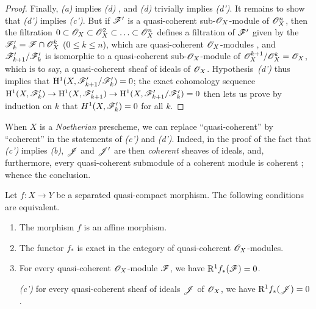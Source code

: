 \begin{proof}
Finally, \emph{(a)} implies \emph{(d)} , and \emph{(d)} trivially implies \emph{(d')}.
It remains to show that \emph{(d')} implies \emph{(c')}.
But if $\mathscr{F}'$ is a quasi-coherent sub-$\mathscr{O}_X$-module of $\mathscr{O}_X^n$, then the filtration $0\subset\mathscr{O}_X\subset\mathscr{O}_X^2\subset\ldots\subset\mathscr{O}_X^n$ defines a filtration of $\mathscr{F}'$ given by the $\mathscr{F}'_k=\mathscr{F}\cap\mathscr{O}_X^k$ ($0\leq k\leq n$), which are quasi-coherent $\mathscr{O}_X$-modules , and $\mathscr{F}'_{k+1}/\mathscr{F}'_k$ is isomorphic to a quasi-coherent sub-$\mathscr{O}_X$-module of $\mathscr{O}_X^{k+1}/\mathscr{O}_X^k=\mathscr{O}_X$, which is to say, a quasi-coherent sheaf of ideals of $\mathscr{O}_X$.
Hypothesis~\emph{(d')} thus implies that $\mathrm{H}^1(X,\mathscr{F}'_{k+1}/\mathscr{F}'_k)=0$;
the exact cohomology sequence $\HH^1(X,\sh{F}'_k)\to\HH^1(X,\sh{F}'_{k+1})\to\HH^1(X,\sh{F}'_{k+1}/\sh{F}'_k)=0$ then lets us prove by induction on $k$ that $H^1(X,\mathscr{F}'_k)=0$ for all $k$.
\end{proof}

\begin{rmk}[5.2.1.1]
\label{2.5.2.1.1}
When $X$ is a \emph{Noetherian} prescheme, we can replace ``quasi-coherent'' by ``coherent'' in the statements of \emph{(c')} and \emph{(d')}.
Indeed, in the proof of the fact that \emph{(c')} implies \emph{(b)}, $\mathscr{J}$ and $\mathscr{J}'$ are then \emph{coherent} sheaves of ideals, and, furthermore, every quasi-coherent submodule of a coherent module is coherent ;
whence the conclusion.
\end{rmk}

\begin{cor}[5.2.2]
\label{2.5.2.2}
Let $f:X\to Y$ be a separated quasi-compact morphism.
The following conditions are equivalent.
\begin{enumerate}[label=\emph{(\alph*)}]
    \item The morphism $f$ is an affine morphism.
    \item The functor $f_*$ is exact in the category of quasi-coherent $\mathscr{O}_X$-modules.
    \item For every quasi-coherent $\mathscr{O}_X$-module $\mathscr{F}$, we have $\mathrm{R}^1 f_*(\mathscr{F})=0$.
    \item[\emph{(c')}] for every quasi-coherent sheaf of ideals $\mathscr{J}$ of $\mathscr{O}_X$, we have $\mathrm{R}^1 f_*(\mathscr{J})=0$.
\end{enumerate}
\end{cor}

